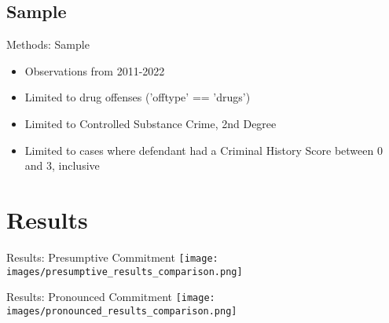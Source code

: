\documentclass[10pt]{beamer}
\begin{document}
\subsection{Sample}
\begin{frame}{Methods: Sample}
    \begin{itemize}
        \item Observations from 2011-2022
        \item Limited to drug offenses ('offtype' == 'drugs')
        \item Limited to Controlled Substance Crime, 2nd Degree
        \item Limited to cases where defendant had a Criminal History Score between 0 and 3, inclusive
    \end{itemize}
\end{frame}



\section{Results}
\begin{frame}{Results: Presumptive Commitment}
    \hspace*{0.95cm}
    \texttt{[image: images/presumptive\_results\_comparison.png]}
\end{frame}

\begin{frame}{Results: Pronounced Commitment}
    \hspace*{0.95cm}
    \texttt{[image: images/pronounced\_results\_comparison.png]}
\end{frame}
\end{document}
